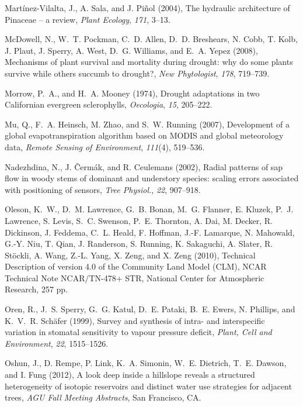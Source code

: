 Mart\'inez-Vilalta, J., A. Sala, and J. Pi\~nol (2004), The hydraulic architecture of Pinaceae -- a review,
\textit{Plant Ecology}, \textit{171}, 3--13.

McDowell, N., W.~T. Pockman, C.~D. Allen, D.~D. Breshears, N. Cobb, T. Kolb, J. Plaut, J. Sperry, A. West, D.~G. Williams, and E.~A. Yepez (2008), Mechanisms of plant survival and mortality during drought: why do some plants survive while others succumb to drought?, 
\textit{New Phytologist}, \textit{178}, 719--739.

Morrow, P.~A., and H.~A. Mooney (1974), Drought adaptations in two Californian evergreen sclerophylls, 
\textit{Oecologia}, \textit{15}, 205--222.

Mu, Q., F.~A. Heinsch, M. Zhao, and S.~W. Running (2007), Development of a global evapotranspiration algorithm based on MODIS and global meteorology data, 
\textit{Remote Sensing of Environment}, \textit{111}(4), 519--536.

Nadezhdina, N., J. \v{C}erm\'{a}k, and R. Ceulemans (2002), Radial patterns of sap flow in woody stems of dominant and understory species: scaling errors associated with positioning of sensors, 
\textit{Tree Physiol.}, \textit{22}, 907--918.

Oleson, K.~W., D.~M. Lawrence, G.~B. Bonan, M.~G. Flanner, E. Kluzek, P.~J. Lawrence, S. Levis, S.~C. Swenson, P.~E. Thornton, A. Dai, M. Decker, R. Dickinson, J. Feddema, C.~L. Heald, F. Hoffman, J.-F. Lamarque, N. Mahowald, G.-Y. Niu, T. Qian, J. Randerson, S. Running, K. Sakaguchi, A. Slater, R. St\"{o}ckli, A. Wang, Z.-L. Yang, X. Zeng, and X. Zeng (2010), Technical Description of version 4.0 of the Community Land Model (CLM), NCAR Technical Note NCAR/TN-478+ STR, National Center for Atmospheric Research, 257 pp.

Oren, R., J.~S. Sperry, G.~G. Katul, D.~E. Pataki, B.~E. Ewers, N. Phillips, and K.~V.~R. Sch\"{a}fer (1999), Survey and synthesis of intra- and interspecific variation in stomatal sensitivity to vapour pressure deficit, 
\textit{Plant, Cell and Environment}, \textit{22}, 1515--1526.

Oshun, J., D. Rempe, P. Link, K.~A. Simonin, W.~E. Dietrich, T.~E. Dawson, and I. Fung (2012), A look deep inside a hillslope reveals a structured heterogeneity of isotopic reservoirs and distinct water use strategies for adjacent trees, \textit{AGU Fall Meeting Abstracts}, San Francisco, CA.

